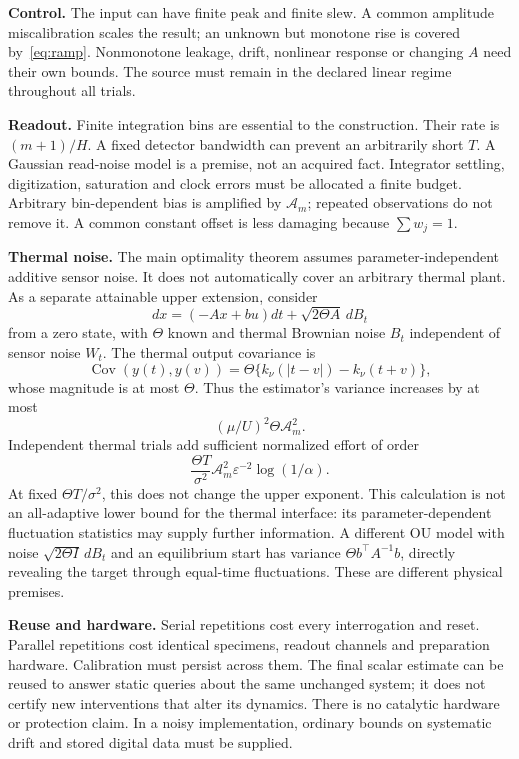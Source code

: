 \documentclass[11pt,a4paper]{article}
\begin{document}
\textbf{Control.} The input can have finite peak and finite slew. A common amplitude miscalibration scales the result; an unknown but monotone rise is covered by~\eqref{eq:ramp}. Nonmonotone leakage, drift, nonlinear response or changing $A$ need their own bounds. The source must remain in the declared linear regime throughout all trials.

\textbf{Readout.} Finite integration bins are essential to the construction. Their rate is $(m+1)/H$. A fixed detector bandwidth can prevent an arbitrarily short $T$. A Gaussian read-noise model is a premise, not an acquired fact. Integrator settling, digitization, saturation and clock errors must be allocated a finite budget. Arbitrary bin-dependent bias is amplified by $\mathcal A_m$; repeated observations do not remove it. A common constant offset is less damaging because $\sum w_j=1$.

\textbf{Thermal noise.} The main optimality theorem assumes parameter-independent additive sensor noise. It does not automatically cover an arbitrary thermal plant. As a separate attainable upper extension, consider
\[
dx=(-Ax+bu)dt+\sqrt{2\Theta A}\,dB_t
\]
from a zero state, with $\Theta$ known and thermal Brownian noise $B_t$ independent of sensor noise $W_t$. The thermal output covariance is
\[
\operatorname{Cov}(y(t),y(v))
=\Theta\{k_\nu(|t-v|)-k_\nu(t+v)\},
\]
whose magnitude is at most $\Theta$. Thus the estimator's variance increases by at most
\[
(\mu/U)^2\Theta\mathcal A_m^2.
\]
Independent thermal trials add sufficient normalized effort of order
\[
\frac{\Theta T}{\sigma^2}\mathcal A_m^2\varepsilon^{-2}\log(1/\alpha).
\]
At fixed $\Theta T/\sigma^2$, this does not change the upper exponent. This calculation is not an all-adaptive lower bound for the thermal interface: its parameter-dependent fluctuation statistics may supply further information. A different OU model with noise $\sqrt{2\Theta I}\,dB_t$ and an equilibrium start has variance $\Theta b^\top A^{-1}b$, directly revealing the target through equal-time fluctuations. These are different physical premises.

\textbf{Reuse and hardware.} Serial repetitions cost every interrogation and reset. Parallel repetitions cost identical specimens, readout channels and preparation hardware. Calibration must persist across them. The final scalar estimate can be reused to answer static queries about the same unchanged system; it does not certify new interventions that alter its dynamics. There is no catalytic hardware or protection claim. In a noisy implementation, ordinary bounds on systematic drift and stored digital data must be supplied.
\end{document}
